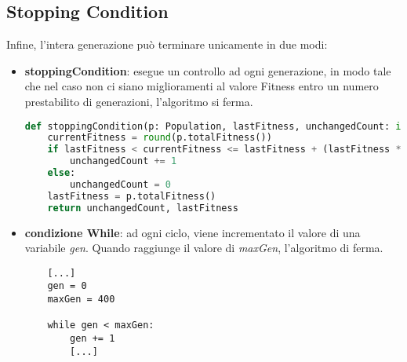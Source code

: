 \documentclass{article}
\begin{document}
\subsection{Stopping Condition}
Infine, l'intera generazione può terminare unicamente in due modi:
\begin{itemize}
    \item \textbf{stoppingCondition}: esegue un controllo ad ogni generazione, in modo tale che nel caso non ci siano miglioramenti al valore Fitness entro un numero prestabilito di generazioni, l'algoritmo si ferma.
\begin{lstlisting}[language=Python, breaklines, no caption]
def stoppingCondition(p: Population, lastFitness, unchangedCount: int, increaseRate: float) -> tuple[int, int]:
    currentFitness = round(p.totalFitness())
    if lastFitness < currentFitness <= lastFitness + (lastFitness * increaseRate):
        unchangedCount += 1
    else:
        unchangedCount = 0
    lastFitness = p.totalFitness()
    return unchangedCount, lastFitness
\end{lstlisting}
\end{itemize}
\begin{itemize}
    \item \textbf{condizione While}: ad ogni ciclo, viene incrementato il valore di una variabile \textit{gen}. Quando raggiunge il valore di \textit{maxGen}, l'algoritmo di ferma.
\begin{lstlisting}
    [...]
    gen = 0
    maxGen = 400

    while gen < maxGen:
        gen += 1
        [...]
\end{lstlisting}

\end{itemize}
\pagebreak
\end{document}
